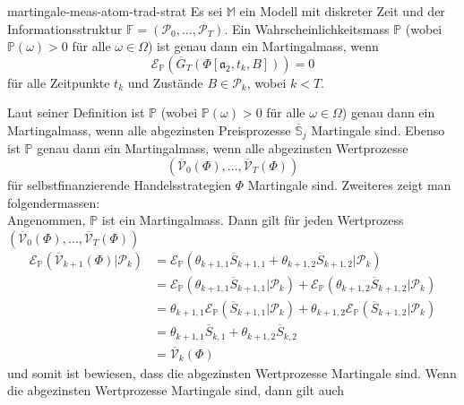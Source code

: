\documentclass[11pt]{report} %
\begin{document}
\begin{Theorem}{}{martingale-meas-atom-trad-strat}
    Es sei $\mathbb{M}$ ein Modell mit diskreter Zeit und der Informationsstruktur $\mathbb{F}=(\mathcal{P}_0, \ldots, \mathcal{P}_T)$. Ein Wahrscheinlichkeitsmass $\mathbb{P}$ (wobei $\mathbb{P}(\omega)>0$ für alle $\omega \in \Omega$) ist genau dann ein Martingalmass, wenn $$\mathcal{E}_{\mathbb{P}}(\overline{G}_T(\Phi[\mathfrak{a}_2, t_k, B]))=0$$ für alle Zeitpunkte $t_k$ und Zustände $B \in \mathcal{P}_k$, wobei $k<T$.
\end{Theorem}
Laut seiner Definition ist $\mathbb{P}$ (wobei $\mathbb{P}(\omega)>0$ für alle $\omega \in \Omega$) genau dann ein Martingalmass, wenn alle abgezinsten Preisprozesse $\overline{\mathbb{S}}_j$ Martingale sind. Ebenso ist $\mathbb{P}$ genau dann ein Martingalmass, wenn alle abgezinsten Wertprozesse $$(\overline{\mathcal{V}}_0(\Phi), \ldots, \overline{\mathcal{V}}_T(\Phi))$$ für selbstfinanzierende Handelsstrategien $\Phi$ Martingale sind. Zweiteres zeigt man folgendermassen:
\\Angenommen, $\mathbb{P}$ ist ein Martingalmass. Dann gilt für jeden Wertprozess $(\overline{\mathcal{V}}_0(\Phi), \ldots, \overline{\mathcal{V}}_T(\Phi))$
\begin{align*}
    \mathcal{E}_\mathbb{P}(\overline{\mathcal{V}}_{k+1}(\Phi)|\mathcal{P}_k) 
    &= \mathcal{E}_\mathbb{P}(\theta_{k+1, 1}\overline{S}_{k+1, 1}+\theta_{k+1, 2}\overline{S}_{k+1, 2}|\mathcal{P}_k)\\
    &= \mathcal{E}_\mathbb{P}(\theta_{k+1, 1}\overline{S}_{k+1, 1}|\mathcal{P}_k)+\mathcal{E}_\mathbb{P}(\theta_{k+1, 2}\overline{S}_{k+1, 2}|\mathcal{P}_k)\\
    &= \theta_{k+1, 1}\mathcal{E}_\mathbb{P}(\overline{S}_{k+1, 1}|\mathcal{P}_k)+\theta_{k+1, 2}\mathcal{E}_\mathbb{P}(\overline{S}_{k+1, 2}|\mathcal{P}_k)\\
    &= \theta_{k+1, 1}\overline{S}_{k, 1}+\theta_{k+1, 2}\overline{S}_{k, 2}\\
    &= \overline{\mathcal{V}}_k(\Phi)
\end{align*}
und somit ist bewiesen, dass die abgezinsten Wertprozesse Martingale sind. 
Wenn die abgezinsten Wertprozesse Martingale sind, dann gilt auch
\end{document}
